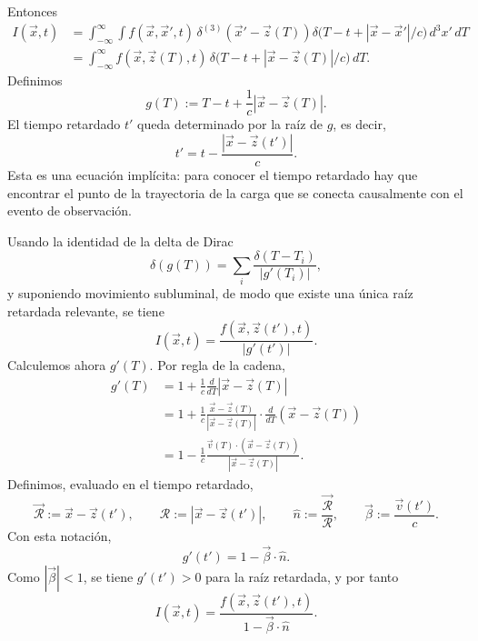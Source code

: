 \documentclass[../main.tex]{subfiles}
\begin{document}
Entonces
\begin{align}
    I(\vec x,t)
    &=\int_{-\infty}^{\infty}\int
    f(\vec x,\vec x',t)\,
    \delta^{(3)}(\vec x'-\vec z(T))
    \delta\!\bigl(T-t+|\vec x-\vec x'|/c\bigr)
    \,d^3x'\,dT \\
    &=\int_{-\infty}^{\infty}
    f(\vec x,\vec z(T),t)\,
    \delta\!\bigl(T-t+|\vec x-\vec z(T)|/c\bigr)\,dT.
    \label{eq:rad-lw-integral-sobre-T}
\end{align}
Definimos
\begin{equation}
    g(T):=T-t+\frac{1}{c}|\vec x-\vec z(T)|.
    \label{eq:rad-lw-gT}
\end{equation}
El tiempo retardado $t'$ queda determinado por la raíz de $g$, es decir,
\begin{equation}
    \boxed{
    t'=t-\frac{|\vec x-\vec z(t')|}{c}.
    }
    \label{eq:rad-lw-tiempo-retardado}
\end{equation}
Esta es una ecuación implícita: para conocer el tiempo retardado hay que encontrar el punto de la trayectoria de la carga que se conecta causalmente con el evento de observación.

Usando la identidad de la delta de Dirac
\begin{equation*}
    \delta(g(T))=\sum_i\frac{\delta(T-T_i)}{|g'(T_i)|},
\end{equation*}
y suponiendo movimiento subluminal, de modo que existe una única raíz retardada relevante, se tiene
\begin{equation}
    I(\vec x,t)=
    \frac{f(\vec x,\vec z(t'),t)}{|g'(t')|}.
    \label{eq:rad-lw-I-con-gprima}
\end{equation}
Calculemos ahora $g'(T)$. Por regla de la cadena,
\begin{align}
    g'(T)
    &=1+\frac{1}{c}\frac{d}{dT}|\vec x-\vec z(T)| \\
    &=1+\frac{1}{c}\frac{\vec x-\vec z(T)}{|\vec x-\vec z(T)|}\cdot\frac{d}{dT}(\vec x-\vec z(T)) \\
    &=1-\frac{1}{c}\frac{\vec v(T)\cdot(\vec x-\vec z(T))}{|\vec x-\vec z(T)|}.
    \label{eq:rad-lw-gprima-calculo}
\end{align}
Definimos, evaluado en el tiempo retardado,
\begin{equation}
    \vec{\mathcal R}:=\vec x-\vec z(t'),
    \qquad
    \mathcal R:=|\vec x-\vec z(t')|,
    \qquad
    \hat n:=\frac{\vec{\mathcal R}}{\mathcal R},
    \qquad
    \vec\beta:=\frac{\vec v(t')}{c}.
    \label{eq:rad-lw-definiciones-retardadas}
\end{equation}
Con esta notación,
\begin{equation}
    g'(t')=1-\vec\beta\cdot\hat n.
    \label{eq:rad-lw-gprima-final}
\end{equation}
Como $|\vec\beta|<1$, se tiene $g'(t')>0$ para la raíz retardada, y por tanto
\begin{equation}
    I(\vec x,t)=
    \frac{f(\vec x,\vec z(t'),t)}{1-\vec\beta\cdot\hat n}.
    \label{eq:rad-lw-I-final}
\end{equation}
\end{document}
